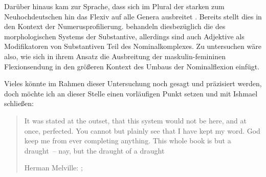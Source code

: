 Darüber hinaus kam zur Sprache, dass sich im Plural der starken
 zum Neuhochdeutschen hin das
Flexiv  auf alle Genera ausbreitet
\autocite[vgl.][191--192]{reichmannwegera1993}. Bereits \citet{askedal1973}
stellt dies in den Kontext der Numerusprofilierung. \citet{dammelgillmann2014} behandeln diesbezüglich die 
des morphologischen Systems der Substantive, allerdings sind
auch Adjektive als Modifikatoren von
Substantiven Teil des Nominalkomplexes. Zu untersuchen wäre also, wie sich in
ihrem Ansatz die Ausbreitung der maskulin-femininen Flexionsendung in den
größeren Kontext des Umbaus der Nominal\-flexion einfügt.


Vieles könnte im Rahmen dieser Untersuchung noch gesagt und präzisiert werden,
doch möchte ich an dieser Stelle einen vorläufigen Punkt setzen und mit Ishmael
schließen: \foreignblockquote{english}[{Herman Melville: ;
\cite[159]{melville:mobydick}}]{It was stated at the outset, that this system
would not be here, and at once, perfected. You cannot but plainly see that I
have kept my word.
\textelp{}
God keep me from ever completing anything. This whole book is but a
draught~-- nay, but the draught of a draught}. %
